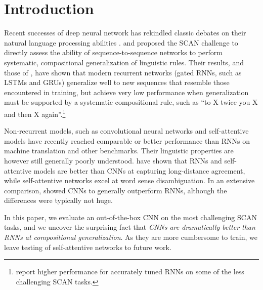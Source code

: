 \section{Introduction}
\label{sec:intro}

Recent successes of deep neural network has rekindled classic
debates on their natural language processing abilities
\cite[e.g.,][]{Kirov:Cotterell:2018,McCoy:etal:2018,Pater:2018}. \citet{Lake:Baroni:2017}
and \citet{Loula:etal:2018} proposed the SCAN challenge to
directly assess the ability of sequence-to-sequence networks to
perform systematic, compositional generalization of linguistic
rules. Their results, and those of \citet{Bastings:etal:2018}, have
shown that modern recurrent networks (gated RNNs, such as LSTMs and GRUs) generalize well
to new sequences that resemble those encountered in training,
but achieve very low performance when generalization must be
supported by a systematic compositional rule, such as ``to X twice
you X and then X again''.\footnote{\citet{Bastings:etal:2018}
  report higher performance for accurately tuned RNNs on
  some of the less challenging SCAN tasks.}

Non-recurrent models, such as convolutional neural networks
\cite[CNNs,][]{kalchbrenner:etal:2016, gehring:etal:2016,
  gehring:etal:2017} and self-attentive models
\cite{vaswani:etal:2017, chen:etal:2018} have recently reached
comparable or better performance than RNNs on machine translation and
other benchmarks. Their linguistic properties are however still
generally poorly understood.  have shown that
RNNs and self-attentive models are better than CNNs at capturing
long-distance agreement, while self-attentive networks excel at word
sense disambiguation. In an extensive comparison,
 showed CNNs to generally outperform RNNs,
although the differences were typically not huge.

In this paper, we evaluate an out-of-the-box CNN on the most
challenging SCAN tasks, and we uncover the surprising fact that
\emph{CNNs are dramatically better than RNNs at compositional
  generalization}. As they are more cumbersome to train, we leave
testing of self-attentive networks to future work.

